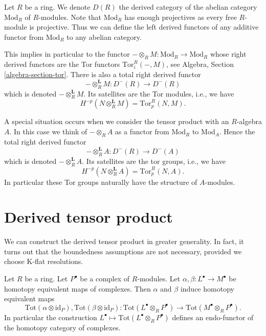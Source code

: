 \noindent
Let $R$ be a ring. We denote $D(R)$ the derived category of the
abelian category $\text{Mod}_R$ of $R$-modules. Note that $\text{Mod}_R$
has enough projectives as every free $R$-module is projective.
Thus we can define the left derived functors of any additive functor
from $\text{Mod}_R$ to any abelian category.

\medskip\noindent
This implies in particular to the functor
$ - \otimes_R M : \text{Mod}_R \to \text{Mod}_R$
whose right derived functors are the Tor functors $\text{Tor}_i^R(-, M)$, see
Algebra, Section \ref{algebra-section-tor}.
There is also a total right derived functor
\begin{equation}
\label{equation-derived-tensor-module}
-\otimes_R^{\mathbf{L}} M :
D^{-}(R)
\longrightarrow
D^{-}(R)
\end{equation}
which is denoted $-\otimes_R^{\mathbf{L}} M$. Its satellites are the
Tor modules, i.e., we have
$$
H^{-p}(N \otimes_R^{\mathbf{L}} M) = \text{Tor}_p^R(N, M).
$$

\medskip\noindent
A special situation occurs when we consider the tensor product with
an $R$-algebra $A$. In this case we think of $- \otimes_R A$
as a functor from $\text{Mod}_R$ to $\text{Mod}_A$. Hence the total
right derived functor
\begin{equation}
\label{equation-derived-tensor-algebra}
-\otimes_R^{\mathbf{L}} A :
D^{-}(R)
\longrightarrow
D^{-}(A)
\end{equation}
which is denoted $-\otimes_R^{\mathbf{L}} A$. Its satellites are the
tor groups, i.e., we have
$$
H^{-p}(N \otimes_R^{\mathbf{L}} A) = \text{Tor}_p^R(N, A).
$$
In particular these Tor groups naturally have the structure of $A$-modules.







\section{Derived tensor product}
\label{section-derived-tensor-product}

\noindent
We can construct the derived tensor product in greater generality.
In fact, it turns out that the boundedness assumptions are not
necessary, provided we choose K-flat resolutions.

\begin{lemma}
\label{lemma-derived-tor-homotopy}
Let $R$ be a ring.
Let $P^\bullet$ be a complex of $R$-modules.
Let $\alpha, \beta : L^\bullet \to M^\bullet$ be homotopy equivalent
maps of complexes. Then $\alpha$ and $\beta$ induce homotopy equivalent
maps
$$
\text{Tot}(\alpha \otimes \text{id}_P),
\text{Tot}(\beta \otimes \text{id}_P) :
\text{Tot}(L^\bullet \otimes_R P^\bullet)
\longrightarrow
\text{Tot}(M^\bullet \otimes_R P^\bullet).
$$
In particular the construction
$L^\bullet \mapsto \text{Tot}(L^\bullet \otimes_R P^\bullet)$
defines an endo-functor of the homotopy category of complexes.
\end{lemma}

